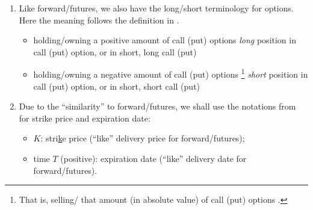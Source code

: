 \begin{enumerate}
\item Like forward/futures, we also have the long/short terminology for
options. Here the meaning follows the definition in
.
\begin{itemize}
\item holding/owning a positive amount of call (put) options 
 \emph{long} position in call (put) option, or in short,
long call (put)
\item holding/owning a negative amount of call (put) options
\footnote{That is, selling/ that amount (in
absolute value) of call (put) options .} 
\emph{short} position in call (put) option, or in short, short call (put)
\end{itemize}

\item Due to the ``similarity'' to forward/futures, we shall use the notations
from  for strike price and expiration date:
\begin{itemize}
\item \(K\): stri\underline{k}e price (``like'' delivery price for forward/futures);
\item time \(T\) (positive): expiration date (``like'' delivery date for
forward/futures).
\end{itemize}
\end{enumerate}
